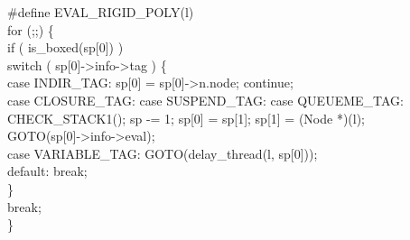 #define EVAL_RIGID_POLY(l) \\
for (;;) \{ \\
    if ( is_boxed(sp[0]) ) \\
        switch ( sp[0]->info->tag ) \{ \\
        case INDIR_TAG: sp[0] = sp[0]->n.node; continue; \\
        case CLOSURE_TAG: case SUSPEND_TAG: case QUEUEME_TAG: \\
            CHECK_STACK1(); sp -= 1; sp[0] = sp[1]; sp[1] = (Node *)(l); \\
            GOTO(sp[0]->info->eval); \\
        case VARIABLE_TAG: GOTO(delay_thread(l, sp[0])); \\
        default: break; \\
        \} \\
    break; \\
\}
\nwendcode{}

%

